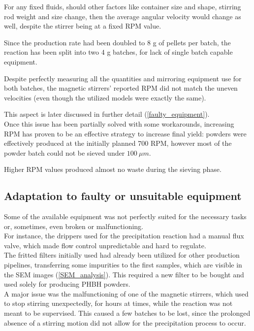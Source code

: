 \documentclass{article}
\begin{document}
        For any fixed fluids, should other factors like container size and shape, stirring rod weight and size change, 
        then the average angular velocity would change as well, despite the stirrer being at a fixed RPM value. 

        Since the production rate had been doubled to 8 g of pellets per batch, the reaction has been split into two 
        4 g batches, for lack of single batch capable equipment. 

        Despite perfectly measuring all the quantities and mirroring equipment use for both batches, the magnetic stirrers'
        reported RPM did not match the uneven velocities (even though the utilized models were exactly the same). 

        This aspect is later discussed in further detail (\ref{faulty_equipment}). \\ 

        Once this issue has been partially solved with some workarounds, increasing RPM has proven to be an effective 
        strategy to increase final yield: powders were effectively produced at the initially planned 700 RPM, however 
        most of the powder batch could not be sieved under $100 \ \mu m$. 

        Higher RPM values produced almost no waste during the sieving phase. 


        \subsection{Adaptation to faulty or unsuitable equipment\label{faulty_equipment}}

        Some of the available equipment was not perfectly suited for the necessary tasks or, sometimes, even broken or malfunctioning. \\ 

        For instance, the drippers used for the precipitation reaction had a manual flux valve, which made flow control unpredictable 
        and hard to regulate. \\ 

        The fritted filters initially used had already been utilized for other production pipelines, transferring some impurities
        to the first samples, which are visible in the SEM images (\ref{SEM_analysis}). This required a new filter to be bought 
        and used solely for producing PHBH powders. \\ 

        A major issue was the malfunctioning of one of the magnetic stirrers, which used to stop stirring unexpectedly, for hours at times, 
        while the reaction was not meant to be supervised. This caused a few batches to be lost, since the prolonged absence of 
        a stirring motion did not allow for the precipitation process to occur. 
\end{document}

